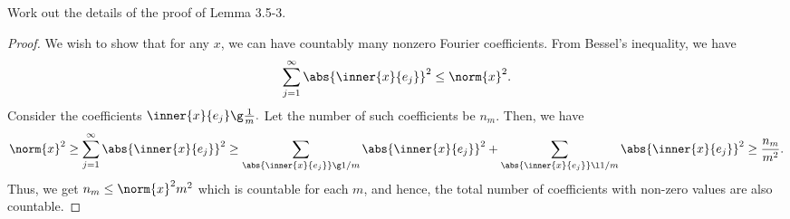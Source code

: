 \begin{question}
    Work out the details of the proof of Lemma 3.5-3.
    \label{section3.5-10}
\end{question}
\begin{proof}
    We wish to show that for any $x$, we can have countably many nonzero Fourier coefficients. From Bessel's inequality, we have
    \[\sum_{j=1}^\infty \abs{\inner{x}{e_j}}^2 \leq \norm{x}^2.\]
    Consider the coefficients $\inner{x}{e_j} \g \frac{1}{m}.$ Let the number of such coefficients be $n_m$. Then, we have
    \[\norm{x}^2 \geq \sum_{j=1}^\infty \abs{\inner{x}{e_j}}^2 \geq \sum_{\abs{\inner{x}{e_j}} \g 1/m} \abs{\inner{x}{e_j}}^2 + \sum_{\abs{\inner{x}{e_j}} \l 1/m} \abs{\inner{x}{e_j}}^2 \geq \frac{n_m}{m^2}.\]
    Thus, we get $n_m \leq \norm{x}^2 m^2$ which is countable for each $m$, and hence, the total number of coefficients with non-zero values are also countable.
\end{proof}
